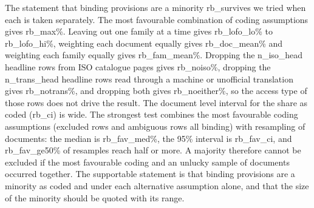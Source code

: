 \documentclass[conference]{IEEEtran}
\begin{document}
The statement that binding provisions are a minority {{rb_survives}} we tried when each is taken separately. The most favourable combination of coding assumptions gives {{rb_max}}\%. Leaving out one family at a time gives {{rb_lofo_lo}}\% to {{rb_lofo_hi}}\%, weighting each document equally gives {{rb_doc_mean}}\% and weighting each family equally gives {{rb_fam_mean}}\%. Dropping the {{n_iso_head}} headline rows from ISO catalogue pages gives {{rb_noiso}}\%, dropping the {{n_trans_head}} headline rows read through a machine or unofficial translation gives {{rb_notrans}}\%, and dropping both gives {{rb_noeither}}\%, so the access type of those rows does not drive the result. The document level interval for the share as coded ({{rb_ci}}) is wide. The strongest test combines the most favourable coding assumptions (excluded rows and ambiguous rows all binding) with resampling of documents: the median is {{rb_fav_med}}\%, the 95\% interval is {{rb_fav_ci}}, and {{rb_fav_ge50}}\% of resamples reach half or more. A majority therefore cannot be excluded if the most favourable coding and an unlucky sample of documents occurred together. The supportable statement is that binding provisions are a minority as coded and under each alternative assumption alone, and that the size of the minority should be quoted with its range.
\end{document}
